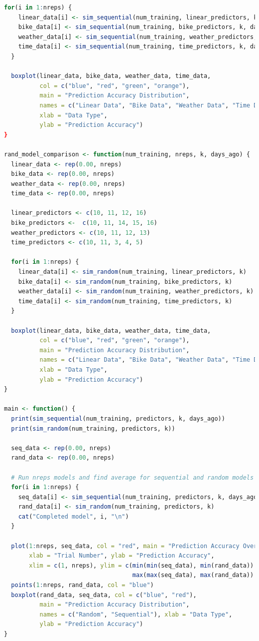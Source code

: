 \documentclass[12pt]{article}
\begin{document}
\begin{lstlisting}[language=R]
  for(i in 1:nreps) {
    linear_data[i] <- sim_sequential(num_training, linear_predictors, k, days_ago)
    bike_data[i] <- sim_sequential(num_training, bike_predictors, k, days_ago)
    weather_data[i] <- sim_sequential(num_training, weather_predictors, k, days_ago)
    time_data[i] <- sim_sequential(num_training, time_predictors, k, days_ago)
  }
  
  boxplot(linear_data, bike_data, weather_data, time_data, 
          col = c("blue", "red", "green", "orange"), 
          main = "Prediction Accuracy Distribution", 
          names = c("Linear Data", "Bike Data", "Weather Data", "Time Data"), 
          xlab = "Data Type", 
          ylab = "Prediction Accuracy")
}

rand_model_comparison <- function(num_training, nreps, k, days_ago) {
  linear_data <- rep(0.00, nreps)
  bike_data <- rep(0.00, nreps)
  weather_data <- rep(0.00, nreps)
  time_data <- rep(0.00, nreps)
  
  linear_predictors <- c(10, 11, 12, 16)
  bike_predictors <-  c(10, 11, 14, 15, 16)
  weather_predictors <- c(10, 11, 12, 13)
  time_predictors <- c(10, 11, 3, 4, 5)
  
  for(i in 1:nreps) {
    linear_data[i] <- sim_random(num_training, linear_predictors, k)
    bike_data[i] <- sim_random(num_training, bike_predictors, k)
    weather_data[i] <- sim_random(num_training, weather_predictors, k)
    time_data[i] <- sim_random(num_training, time_predictors, k)
  }
  
  boxplot(linear_data, bike_data, weather_data, time_data, 
          col = c("blue", "red", "green", "orange"), 
          main = "Prediction Accuracy Distribution", 
          names = c("Linear Data", "Bike Data", "Weather Data", "Time Data"), 
          xlab = "Data Type", 
          ylab = "Prediction Accuracy")
}

main <- function() {
  print(sim_sequential(num_training, predictors, k, days_ago))
  print(sim_random(num_training, predictors, k))
  
  seq_data <- rep(0.00, nreps)
  rand_data <- rep(0.00, nreps)
  
  # Run nreps models and find average for sequential and random models
  for(i in 1:nreps) {
    seq_data[i] <- sim_sequential(num_training, predictors, k, days_ago)
    rand_data[i] <- sim_random(num_training, predictors, k)
    cat("Completed model", i, "\n")
  }
  
  plot(1:nreps, seq_data, col = "red", main = "Prediction Accuracy Over 100 Trials", 
       xlab = "Trial Number", ylab = "Prediction Accuracy",
       xlim = c(1, nreps), ylim = c(min(min(seq_data), min(rand_data)) - 0.025, 
                                    max(max(seq_data), max(rand_data)) + 0.025))
  points(1:nreps, rand_data, col = "blue")
  boxplot(rand_data, seq_data, col = c("blue", "red"), 
          main = "Prediction Accuracy Distribution", 
          names = c("Random", "Sequential"), xlab = "Data Type", 
          ylab = "Prediction Accuracy")
}


\end{lstlisting}
\end{document}
